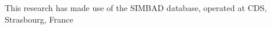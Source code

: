 \documentclass[fleqn,usenatbib,letters]{mnras}%
\begin{document}
This research has made use of the SIMBAD database, operated at CDS, Strasbourg, France~\citep{wenger2000}












%
%




\bsp	%
\label{lastpage}
\end{document}
